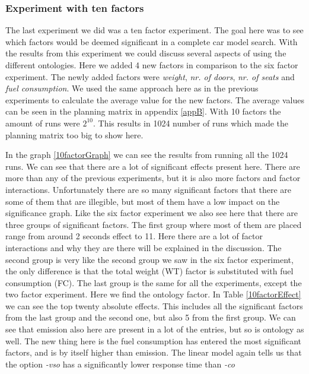 \documentclass{llncs}
\begin{document}
\subsubsection{Experiment with ten factors}
The last experiment we did was a ten factor experiment. The goal here
was to see which factors would be deemed significant in a complete car
model search. With the results from this experiment we could discuss
several aspects of using the different ontologies.  Here we added 4
new factors in comparison to the six factor experiment. The newly
added factors were \emph{weight}, \emph{nr. of doors},
\emph{nr. of seats} and \emph{fuel consumption}. We used the same
approach here as in the previous experiments to calculate the average
value for the new factors. The average values can be seen in the
planning matrix in appendix \ref{appB}. With 10 factors the amount of
runs were $2^{10}$. This results in 1024 number of runs which made the
planning matrix too big to show here.

In the graph \ref{10factorGraph} we can see the results from running
all the 1024 runs.  We can see that there are a lot of significant
effects present here. There are more than any of the previous
experiments, but it is also more factors and factor interactions.
Unfortunately there are so many significant factors that there are
some of them that are illegible, but most of them have a low impact on
the significance graph. Like the six factor experiment we also see
here that there are three groups of significant factors. The first
group where most of them are placed range from around 2 seconds effect
to 11. Here there are a lot of factor interactions and why they are
there will be explained in the discussion.  The second group is very
like the second group we saw in the six factor experiment, the only
difference is that the total weight (WT) factor is substituted with
fuel consumption (FC). The last group is the same for all the
experiments, except the two factor experiment. Here we find the
ontology factor.  In Table \ref{10factorEffect} we can see the top
twenty absolute effects. This includes all the significant factors
from the last group and the second one, but also 5 from the first
group.  We can see that emission also here are present in a lot of the
entries, but so is ontology as well. The new thing here is the fuel
consumption has entered the most significant factors, and is by itself
higher than emission. The linear model again tells us that the option
\emph{-vso} has a significantly lower response time than
\emph{-co}
\end{document}
